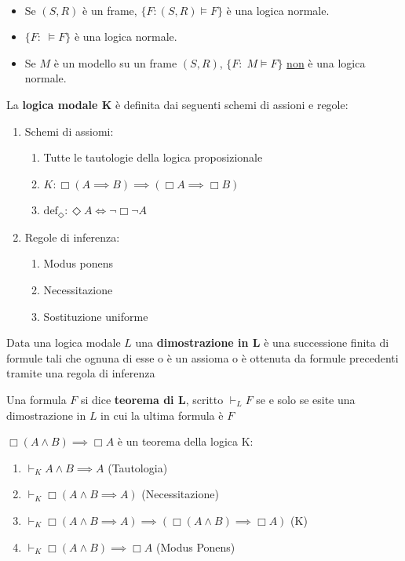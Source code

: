 \documentclass[../main.tex]{subfiles}
\begin{document}
\begin{example}\
    \begin{itemize}
        \item Se $(S,R)$ è un frame, $\{F: (S,R) \vDash F\}$ è una logica normale.
        \item $\{F: \; \vDash F\}$ è una logica normale.
        \item Se $M$ è un modello su un frame $(S,R)$, $\{F: \; M \vDash F\}$ \underline{non} è una logica normale.
    \end{itemize}
\end{example}
\begin{definition}
    La \textbf{logica modale K} è definita dai seguenti schemi di assioni e regole:
    \begin{enumerate}
        \item Schemi di assiomi:
              \begin{enumerate}
                  \item Tutte le tautologie della logica proposizionale
                  \item $K: \Box (A \implies B) \implies (\Box A \implies \Box B)$
                  \item $\text{def}_\Diamond : \Diamond A \iff \neg \Box \neg A$
              \end{enumerate}
        \item Regole di inferenza:
              \begin{enumerate}
                  \item Modus ponens
                  \item Necessitazione
                  \item Sostituzione uniforme
              \end{enumerate}
    \end{enumerate}
\end{definition}
\begin{definition}
    Data una logica modale $L$ una \textbf{dimostrazione in L} è una successione finita di formule tali che ognuna di esse o è un assioma o è ottenuta da formule precedenti tramite una regola di inferenza
\end{definition}
\begin{definition}
    Una formula $F$ si dice \textbf{teorema di L}, scritto $\vdash_L F$ se e solo se esite una dimostrazione in $L$ in cui la ultima formula è $F$
\end{definition}
\begin{example}
    $\Box (A \land B) \implies \Box A$ è un teorema della logica K:
    \begin{enumerate}
        \item $\vdash_K A \land B \implies A$ (Tautologia)
        \item $\vdash_K \Box (A \land B \implies A)$ (Necessitazione)
        \item $\vdash_K \Box (A \land B \implies A ) \implies (\Box (A \land B ) \implies \Box A)$ (K)
        \item $\vdash_K \Box (A \land B ) \implies \Box A$ (Modus Ponens)
    \end{enumerate}
\end{example}
\end{document}
